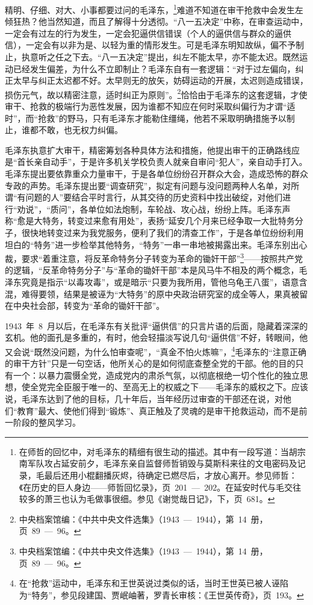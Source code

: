 精明、仔细、对大、小事都要过问的毛泽东，\footnote{在师哲的回忆中，对毛泽东的精细有很生动的描述。其中有一段写道：当胡宗南军队攻占延安前夕，毛泽东亲自监督师哲销毁与莫斯科来往的文电密码及记录，毛最后还用小棍翻播灰烬，待确定已燃尽后，才放心离开。参见师哲：《在历史的巨人身边——师哲回忆录》，页~201~—~202。在延安时代与毛交往较多的萧三也认为毛做事很细。参见《谢觉哉日记》，下，页~681。}难道不知道在审干抢救中会发生左倾狂热？他当然知道，而且了解得十分透彻。“八一五决定”中称，在审查运动中，一定会有过左的行为发生，一定会犯逼供信错误（个人的逼供信与群众的逼供信），一定会有以非为是、以轻为重的情形发生。可是毛泽东明知故纵，偏不予制止，执意听之任之下去。“八一五决定”提出，纠左不能太早，亦不能太迟。既然运动已经发生偏差，为什么不立即制止？毛泽东自有一套逻辑：“对于过左偏向，纠正太早与纠正太迟都不好。太早则无的放矢，妨碍运动的开展，太迟则造成错误，损伤元气，故以精密注意，适时纠正为原则”。\footnote{中央档案馆编：《中共中央文件选集》（1943~—~1944），第~14~册，页~89~—~96。}恰恰由于毛泽东的这套逻辑，才使审干、抢救的极端行为恶性发展，因为谁都不知应在何时采取纠偏行为才谓“适时”，而“抢救”的野马，只有毛泽东才能勒住缰绳，他若不采取明确措施予以制止，谁都不敢，也无权力纠偏。

毛泽东执意扩大审干，精密筹划各种具体方法和措施，他提出审干的正确路线应是“首长亲自动手”，于是许多机关学校负责人就亲自审问“犯人”，亲自动手打入。毛泽东提出要依靠重众力量审干，于是各单位纷纷召开群众大会，造成恐怖的群众专政的声势。毛泽东提出要“调查研究”，拟定有问题与没问题两种人名单，对所谓“有问题的人”要结合平时言行，从其交待的历史资料中找出破绽，对他们进行“劝说”，“质问”，各单位如法炮制，车轮战、攻心战，纷纷上阵。毛泽东声称“愈是大特务，转变过来愈有用处”，表扬“延安几个月来已经争取一大批特务分子，很快地转变过来为我党服务，便利了我们的清查工作”，于是各单位纷纷利用坦白的“特务”进一步检举其他特务，“特务”一串一串地被揭露出来。毛泽东别出心裁，要求“着重注意，将反革命特务分子转变为革命的锄奸干部”\footnote{中央档案馆编：《中共中央文件选集》（1943~—~1944），第~14~册，页~89~—~96。}——按照共产党的逻辑，“反革命特务分子”与“革命的锄奸干部”本是风马牛不相及的两个概念，毛泽东究竟是指示“以毒攻毒”，或是暗示“只要为我所用，管他乌龟王八蛋”，语意含混，难得要领，结果是被诬为“大特务”的原中央政治研究室的成全等人，果真被留在中央社会部，转变为“革命的锄奸干部”。

1943~年~8~月以后，在毛泽东有关批评“逼供信”的只言片语的后面，隐藏着深深的玄机。他的面孔是多重的，有时，他会轻描淡写说几句“逼供信”不好，转眼间，他又会说“既然没问题，为什么怕审查呢”，“真金不怕火炼嘛”，\footnote{在“抢救”运动中，毛泽东和王世英说过类似的话，当时王世英已被人诬陷为“特务”，参见段建国、贾岷岫著，罗青长审核：《王世英传奇》，页~193。}毛泽东的“注意正确的审干方针”只是一句空话，他所关心的是如何彻底查整全党的干部。他的目的只有一个：以暴力震慑全党，造成党内的肃杀气氛，以彻底根绝一切个性化的独立思想，使全党完全臣服于唯一的、至高无上的权威之下——毛泽东的威权之下。应该说，毛泽东达到了他的目标，几十年后，当年经历过审查的干部还在说，对他们“教育”最大、使他们得到“锻炼”、真正触及了灵魂的是审干抢救运动，而不是前一阶段的整风学习。

